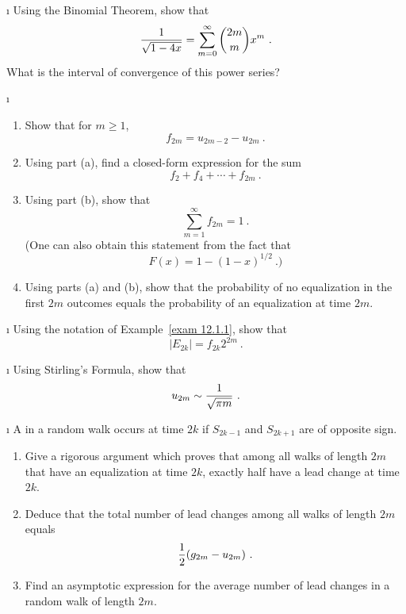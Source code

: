 \exercises
\begin{LJSItem}
 
\i\label{exer 12.1.1} Using the Binomial Theorem, show that
$${1\over{\sqrt {1 - 4x}}} = \sum_{m = 0}^\infty {2m \choose m} x^m\ .$$
What is the interval of convergence of this power series?

\i\label{exer 12.1.2}
\begin{enumerate}

\item Show that for $m \ge 1$, 
$$f_{2m} = u_{2m-2} - u_{2m}\ .$$

\item Using part (a), find a closed-form expression for the sum
$$f_2 + f_4 + \cdots + f_{2m}\ .$$

\item Using part (b), show that
$$\sum_{m = 1}^\infty f_{2m} = 1\ .$$
(One can also obtain this statement from the fact that 
$$F(x) = 1 - (1-x)^{1/2}\ .)$$

\item Using parts (a) and (b), show that the probability of no equalization in the 
first $2m$ outcomes equals the probability of an equalization at time $2m$.
\end{enumerate}

\i\label{exer 12.1.3} Using the notation of Example~\ref{exam 12.1.1}, show that
$$|E_{2k}| = f_{2k} 2^{2m}\ .$$

\i\label{exer 12.1.4} Using Stirling's Formula, show that 
$$u_{2m} \sim {1\over{\sqrt {\pi m}}}\ .$$

\i\label{exer 12.1.5} A  in a random walk occurs at time
$2k$ if
$S_{2k-1}$ and $S_{2k+1}$ are of opposite sign.  
\begin{enumerate}
\item Give a rigorous argument which proves that
among all walks of length $2m$ that have an equalization at time $2k$, exactly half have a lead
change at time $2k$.

\item  Deduce that the total number of lead changes among all walks of length $2m$ equals
$${1\over 2}(g_{2m} - u_{2m})\ .$$

\item Find an asymptotic expression for the average number of lead changes in a random walk
of length $2m$. 
\end{enumerate}


\end{LJSItem}
